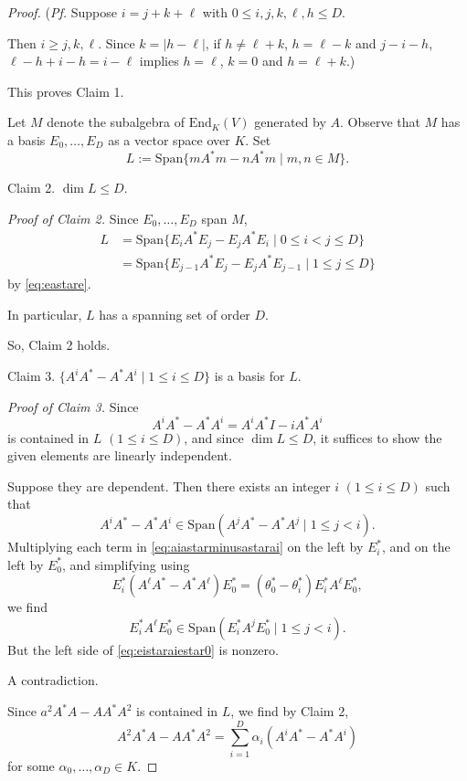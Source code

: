 \documentclass[
]{book}
\theoremstyle{definition}
\theoremstyle{definition}
\theoremstyle{definition}
\theoremstyle{definition}
\theoremstyle{remark}
\begin{document}
\begin{proof}
(\emph{Pf.} Suppose \(i=j+k+\ell\) with \(0\leq i, j, k,\ell, h\leq D\).

Then \(i \geq j, k, \ell\). Since \(k = |h-\ell|\), if \(h\neq \ell+k\), \(h = \ell-k\) and \(j - i-h\),
\(\ell-h+i-h = i-\ell\) implies \(h=\ell\), \(k = 0\) and \(h = \ell + k\).)

This proves Claim 1.

Let \(M\) denote the subalgebra of \(\mathrm{End}_K(V)\) generated by \(A\). Observe that \(M\) has a basis \(E_0, \ldots, E_D\) as a vector space over \(K\). Set
\[L:= \mathrm{Span}\{mA^*m-nA^*m \mid m, n\in M\}.\]

Claim 2. \(\dim L \leq D\).

\emph{Proof of Claim 2.}
Since \(E_0, \ldots, E_D\) span \(M\),
\begin{align}
L & = \mathrm{Span}\{E_iA^*E_j - E_jA^*E_i \mid 0\leq i < j \leq D\}\\
& = \mathrm{Span}\{E_{j-1}A^*E_j - E_jA^*E_{j-1} \mid 1\leq j \leq D\}
\end{align}
by \eqref{eq:eastare}.

In particular, \(L\) has a spanning set of order \(D\).

So, Claim 2 holds.

Claim 3. \(\{A^iA^* - A^*A^i\mid 1\leq i\leq D\}\) is a basis for \(L\).

\emph{Proof of Claim 3.}
Since
\[A^iA^*-A^*A^i = A^iA^*I - iA^*A^i\]
is contained in \(L\) \((1\leq i\leq D)\), and since \(\dim L \leq D\), it suffices to show the given elements are linearly independent.

Suppose they are dependent. Then there exists an integer \(i\) \((1\leq i\leq D)\) such that
\begin{equation}
A^iA^*-A^*A^i \in \mathrm{Span}(A^jA^*-A^*A^j\mid 1\leq j < i). \label{eq:aiastarminusastarai}
\end{equation}
Multiplying each term in \eqref{eq:aiastarminusastarai} on the left by \(E^*_i\), and on the left by \(E^*_0\), and simplifying using
\[E^*_i(A^\ell A^*-A^*A^\ell)E^*_0 = (\theta^*_0-\theta^*_i)E^*_iA^\ell E^*_0,\]
we find
\begin{equation}
E^*_iA^\ell E^*_0 \in \mathrm{Span}(E^*_iA^jE^*_0\mid 1\leq j < i). \label{eq:eistaraiestar0}
\end{equation}
But the left side of \eqref{eq:eistaraiestar0} is nonzero.

A contradiction.

Since \(a^2A^*A-AA^*A^2\) is contained in \(L\), we find by Claim 2,
\begin{equation}
A^2A^*A - AA^*A^2 = \sum_{i=1}^D\alpha_i(A^iA^*-A^*A^i) \label{eq:a2astara}
\end{equation}
for some \(\alpha_0, \ldots, \alpha_D\in K\).


\end{proof}
\end{document}
